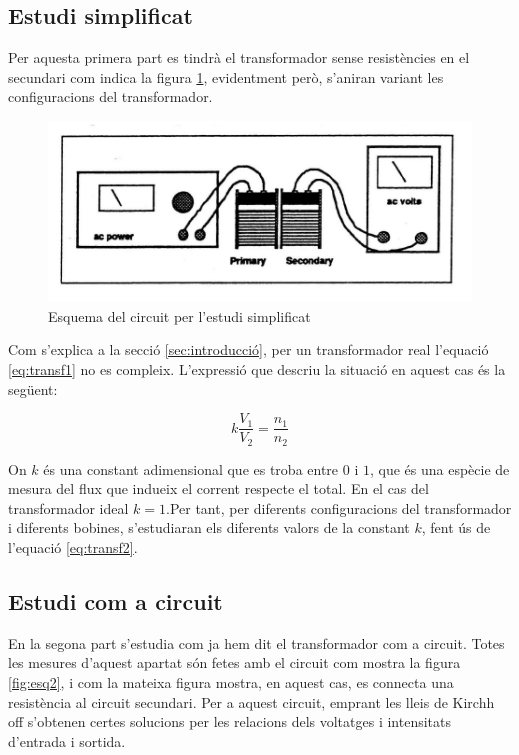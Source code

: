 \subsection{Estudi simplificat}
Per aquesta primera part es tindrà el transformador sense resistències en el secundari com indica la figura  \cref{fig:esq1}, evidentment però, s'aniran variant les configuracions del transformador.

\begin{figure}[htbp!]
    \centering \small \sffamily
    \includegraphics{Esqtransf.png}
    \caption{Esquema del circuit per l'estudi simplificat}
    \label{fig:esq1}
\end{figure}

Com s'explica a la secció \cref{sec:introducció}, per un transformador real l'equació \cref{eq:transf1} no es compleix. L'expressió que descriu la situació en aquest cas és la següent:

\begin{equation}\label{eq:transf2}
     k\frac{V_1}{V_2}=\frac{n_1}{n_2}
\end{equation}

On $k$ és una constant adimensional que es troba entre $0$ i $1$, que és una espècie de mesura del flux que indueix el corrent respecte el total. En el cas del transformador ideal $k=1$.Per tant, per diferents configuracions del transformador i diferents bobines, s'estudiaran els diferents valors de la constant $k$, fent ús de l'equació \cref{eq:transf2}.

\subsection{Estudi com a circuit}\label{sec:metcirc}

En la segona part s'estudia com ja hem dit el transformador com a circuit. Totes les mesures d'aquest apartat són fetes amb el circuit com mostra la figura \cref{fig:esq2}, i com la mateixa figura mostra, en aquest cas, es connecta una resistència al circuit secundari. Per a aquest circuit, emprant les lleis de Kirchh
off s'obtenen certes solucions per les relacions dels voltatges i intensitats d'entrada i sortida. 

